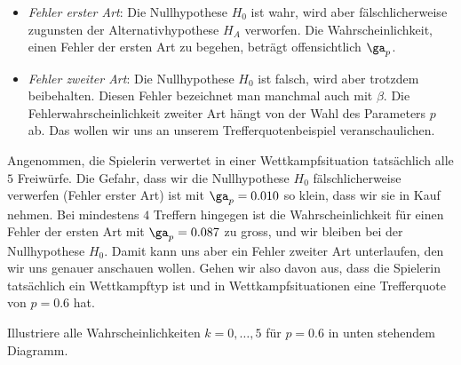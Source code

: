 \documentclass[%
11pt,%
twoside,%
titlepage,%
german,%
headsepline%
]{scrartcl}
\begin{document}
\begin{itemize}
\item \emph{Fehler erster Art}: Die Nullhypothese $H_0$ ist wahr, wird aber fälschlicherweise zugunsten der Alternativhypothese $H_A$ verworfen. Die Wahrscheinlichkeit, einen Fehler der ersten Art zu begehen, beträgt offensichtlich $\ga_p$.
\item \emph{Fehler zweiter Art}:
Die Nullhypothese $H_0$ ist falsch, wird aber trotzdem beibehalten. Diesen Fehler bezeichnet man manchmal auch mit $\beta$. Die Fehlerwahrscheinlichkeit zweiter Art hängt von der Wahl des Parameters $p$ ab. Das wollen wir uns an unserem Trefferquotenbeispiel veranschaulichen.
\end{itemize}

Angenommen, die Spielerin verwertet in einer Wettkampfsituation tatsächlich alle $5$ Freiwürfe. Die Gefahr, dass wir die Nullhypothese $H_0$ fälschlicherweise verwerfen (Fehler erster Art) ist mit $\ga_p=0.010$ so klein, dass wir sie in Kauf nehmen. Bei mindestens $4$ Treffern hingegen ist die Wahrscheinlichkeit für einen Fehler der ersten Art mit $\ga_p=0.087$ zu gross, und wir bleiben bei der Nullhypothese $H_0$. Damit kann uns aber ein Fehler zweiter Art unterlaufen, den wir uns genauer anschauen wollen. Gehen wir also davon aus, dass die Spielerin tatsächlich ein Wettkampftyp ist und in Wettkampfsituationen eine Trefferquote von $p=0.6$ hat.

\begin{ueb}
Illustriere alle Wahrscheinlichkeiten $k=0,\dots,5$ für $p=0.6$ in unten stehendem Diagramm.
\end{ueb}

\begin{center}
\end{center}
\end{document}
